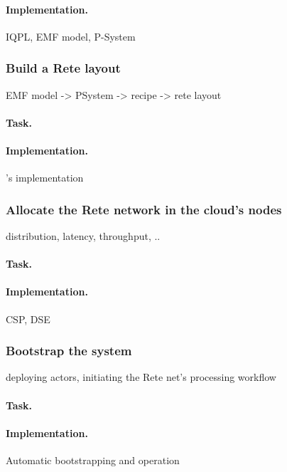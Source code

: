 \paragraph{Implementation.} IQPL, EMF model, P-System 


\subsubsection{Build a Rete layout}

EMF model -> PSystem -> recipe -> rete layout

\paragraph{Task.}  

\paragraph{Implementation.} \eiq{}'s implementation 


\subsubsection{Allocate the Rete network in the cloud's nodes}

distribution, latency, throughput, .. 

\paragraph{Task.} 

\paragraph{Implementation.} CSP, DSE~\cite{DSE11}


\subsubsection{Bootstrap the system}

deploying actors, initiating the Rete net's processing workflow

\paragraph{Task.} 

\paragraph{Implementation.} Automatic bootstrapping and operation 




